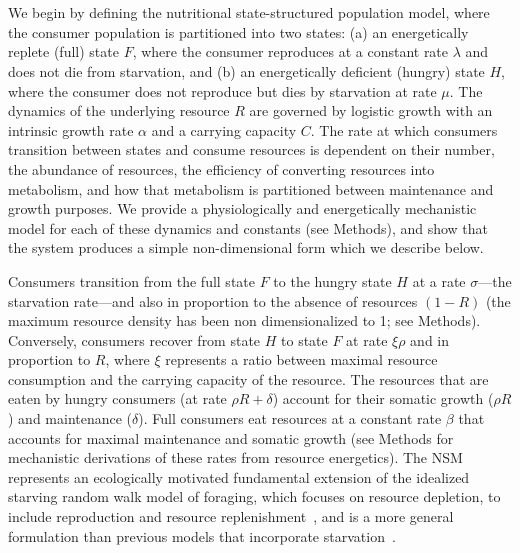 \documentclass[twocolumn,preprintnumbers,amsmath,amssymb,superscriptaddress]{revtex4}
\begin{document}
\\
\\
We begin by defining the nutritional state-structured population model, where the consumer population is partitioned into two states: (a) an
energetically replete (full) state $F$, where the consumer reproduces at a
constant rate $\lambda$ and does not die from starvation, and (b) an
energetically deficient (hungry) state $H$, where the consumer does not
reproduce but dies by starvation at rate $\mu$. The dynamics of the
underlying resource $R$ are governed by logistic growth with an intrinsic
growth rate $\alpha$ and a carrying capacity $C$. The rate at which consumers
transition between states and consume resources is dependent on their number,
the abundance of resources, the efficiency of converting resources into
metabolism, and how that metabolism is partitioned between maintenance and
growth purposes.  We provide a physiologically and energetically mechanistic
model for each of these dynamics and constants (see Methods), and show that the system produces a simple non-dimensional form which
we describe below.


Consumers transition from the full state $F$ to the hungry state $H$ at a
rate $\sigma$---the starvation rate---and also in proportion to the absence
of resources $(1-R)$ (the maximum resource density has been non
dimensionalized to 1; see Methods).  Conversely, consumers recover from state $H$
to state $F$ at rate $\xi \rho$ and in proportion to $R$, where $\xi$
represents a ratio between maximal resource consumption and the carrying
capacity of the resource. %
The resources that are eaten by hungry consumers (at rate $\rho R + \delta$)
account for their somatic growth ($\rho R$) and maintenance ($\delta$).  Full
consumers eat resources at a constant rate $\beta$ that accounts for maximal
maintenance and somatic growth (see Methods for mechanistic derivations of
these rates from resource energetics).
The NSM represents an ecologically motivated fundamental extension of the
idealized starving random walk model of foraging, which focuses on resource
depletion, to include reproduction and resource
replenishment~\citep{Benichou:2014wu,Benichou:2016wl,Chupeau:2016jf}, and is
a more general formulation than previous models that incorporate
starvation~\citep{Persson:1998hz}.
\end{document}
